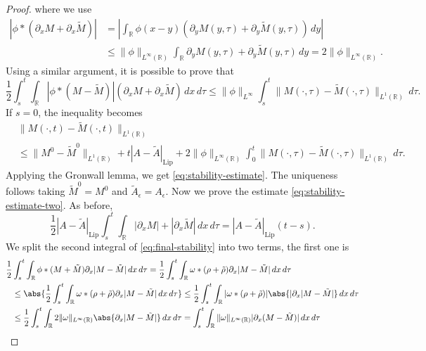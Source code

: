 \documentclass[11pt,a4paper,oneside]{amsart}
\newcommand\R{\mathbb{R}}
\newcommand{\Lip}{\text{Lip}}
\newcommand\eps{\epsilon}
\begin{document}
\begin{proof}
        where we use 
        \begin{align*}
         \left| \phi\ast(\partial_x M+\partial_x \tilde M) \right| & = \left| \int_\R \phi(x-y)(\partial_y M(y,\tau)+\partial_y \tilde M(y,\tau))\,dy \right|\\
        & \leq \|\phi\|_{L^\infty(\R)}\int_\R \partial_y M(y,\tau)+\partial_y \tilde M(y,\tau)\,dy=2\|\phi\|_{L^\infty(\R)}.
        \end{align*}
        Using a similar argument, it is possible to prove that
        $$
        \frac{1}{2}\int_s^t\int_\R |\phi\ast(M-\tilde M)|(\partial_x M+\partial_x \tilde M)\,dx\,d\tau 
        \leq \|\phi\|_{L^\infty}\int_s^t\|M(\cdot,\tau)-\tilde M(\cdot,\tau)\|_{L^1(\R)}\,d\tau.
        $$
        If $s=0$, the inequality becomes
        \begin{equation}
             \begin{aligned}\label{eq:inequality1}
            & \|M(\cdot,t)-\tilde M(\cdot,t)\|_{L^1(\R)}\\
            & \leq \|M^0-\tilde M^0\|_{L^1(\R)}+t|A-\tilde A|_{\Lip}+2\|\phi\|_{L^\infty(\R)}\int_0^t\|M(\cdot,\tau)-\tilde M(\cdot,\tau)\|_{L^1(\R)}\,d\tau.
        \end{aligned}
         \end{equation}
        Applying the Gronwall lemma, we get \eqref{eq:stability-estimate}. The uniqueness follows taking $\tilde M^0=M^0$ and $\tilde A_\eps= A_\eps$.\newline
        Now we prove the estimate \eqref{eq:stability-estimate-two}. As before,
$$
\frac{1}{2}|A-\tilde A|_{\Lip}\int_s^t\int_\R |\partial_x M|+|\partial_x \tilde M|\,dx\,d\tau = |A-\tilde A|_{\Lip}(t-s).
$$
We split the second integral of \eqref{eq:final-stability} into two terms, the first one is
\begin{align*}
     \frac{1}{2} & \int_s^t\int_\R \phi\ast(M+\tilde M)\partial_x|M-\tilde M|\,dx\,d\tau
     =\frac{1}{2}\int_s^t\int_\R \omega\ast(\rho+\tilde\rho)\partial_x|M-\tilde M|\,dx\,d\tau \\ 
     & \leq \abs{\frac{1}{2}\int_s^t\int_\R \omega\ast(\rho+\tilde\rho)\partial_x|M-\tilde M|\,dx\,d\tau}
    \leq \frac{1}{2}\int_s^t\int_\R |\omega\ast(\rho+\tilde\rho)|\abs{|\partial_x|M-\tilde M|}\,dx\,d\tau \\
    & \leq \frac{1}{2} \int_s^t\int_\R 2\|\omega\|_{L^\infty(\R)}\abs{\partial_x|M-\tilde M|}\,dx\,d\tau 
    =\int_s^t\int_\R \|\omega\|_{L^\infty(\R)}|\partial_x(M-\tilde M)|\,dx\,d\tau\\

\end{align*}
\end{proof}
\end{document}
